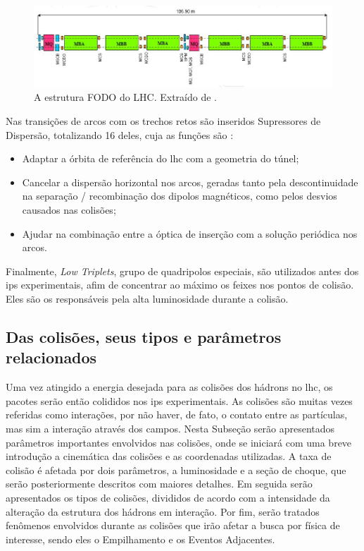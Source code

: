 \begin{figure}[h!t]
\centering
\includegraphics[width=\textwidth]{imagens/fodo_lhc.jpg}
\caption[A estrutura FODO do LHC.]{A estrutura FODO do LHC. Extraído de \cite{closerLook}.}
\label{fig:fodo_lhc}
\end{figure}

Nas transições de arcos com os trechos retos são inseridos 
Supressores de Dispersão, totalizando 16 deles, cuja as funções são
\cite{lhc_design}:

\begin{itemize}
\item Adaptar a órbita de referência do \gls{lhc} com a geometria do túnel;
\item Cancelar a dispersão horizontal nos arcos, geradas tanto pela descontinuidade na
separação / recombinação dos dipolos magnéticos, como pelos desvios causados nas
colisões;
\item Ajudar na combinação entre a óptica de inserção com a solução periódica nos arcos.
\end{itemize}

Finalmente, \emph{Low Triplets}, grupo de quadripolos especiais, são utilizados antes dos
\glspl{ip} experimentais, afim de concentrar ao máximo os feixes nos pontos de
colisão. Eles são os responsáveis pela alta luminosidade durante a colisão.


\subsection{Das colisões, seus tipos e parâmetros relacionados}
\label{ssec:lhc_col}

Uma vez atingido a energia desejada para as colisões dos hádrons no \gls{lhc}, 
os pacotes serão então colididos nos \glspl{ip} experimentais. As colisões são
muitas vezes referidas como interações, por não haver, de fato, o contato
entre as partículas, mas sim a interação através dos campos.
Nesta Subseção serão apresentados parâmetros importantes envolvidos nas
colisões, onde se iniciará com uma breve introdução a cinemática das colisões e as 
coordenadas utilizadas. A taxa de colisão é
afetada por dois parâmetros, a luminosidade e a seção de choque, que serão
posteriormente descritos com maiores detalhes. Em seguida serão
apresentados os tipos de colisões, divididos de acordo com a intensidade da
alteração da estrutura dos hádrons em interação. Por fim, serão tratados
fenômenos envolvidos durante as colisões que irão afetar a busca por física 
de interesse, sendo eles o Empilhamento e os Eventos Adjacentes. 

